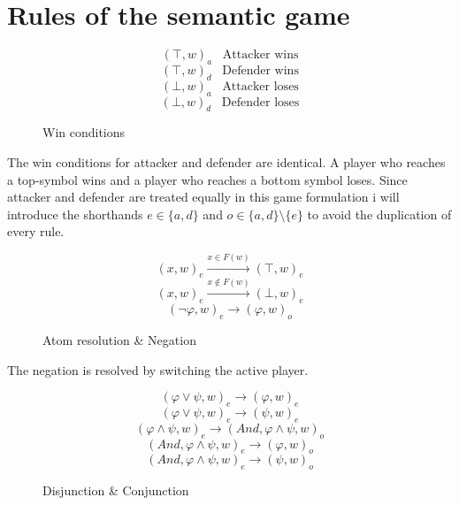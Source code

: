 \documentclass[a4paper,american]{paper}
\theoremstyle{definition}\newtheorem{definition}{Definition}
\begin{document}
\section*{Rules of the semantic game}
\begin{figure}[H]
	\centering
	\begin{equation}
		(\top ,w)_{a}\hspace{10pt}\text{Attacker wins}
	\end{equation}
	\begin{equation}
		(\top ,w)_{d}\hspace{10pt}\text{Defender wins}
	\end{equation}
	\begin{equation}
		(\bot ,w)_{a}\hspace{10pt}\text{Attacker loses}
	\end{equation}
	\begin{equation}
		(\bot ,w)_{d}\hspace{10pt}\text{Defender loses}
	\end{equation}
	\caption{Win conditions}
	\label{fig:win_rules}
\end{figure}
	The win conditions for attacker and defender are identical.
	A player who reaches a top-symbol wins and a player who reaches a bottom symbol loses.
	Since attacker and defender are treated equally in this game formulation i will introduce the shorthands $e\in\{ a, d\}$ and $o \in \{ a, d\}\setminus{}\{ e\}$ to avoid the duplication of every rule.
\begin{figure}[H]
	\centering
	\begin{equation}
		(x,w)_{e}\xrightarrow{x\in F(w)}(\top ,w)_{e}
	\end{equation}
	\begin{equation}
		(x,w)_{e}\xrightarrow{x\not\in F(w)}(\bot ,w)_{e}
	\end{equation}
	\begin{equation}
		(\neg\varphi ,w)_{e}\rightarrow (\varphi ,w)_{o}
	\end{equation}
	\caption{Atom resolution \& Negation}
	\label{fig:neg_rules}
\end{figure}
	The negation is resolved by switching the active player.
\begin{figure}[H]
	\centering
	\begin{equation}
		(\varphi\vee\psi ,w)_e\rightarrow (\varphi ,w)_{e}
	\end{equation}
	\begin{equation}
		(\varphi\vee\psi ,w)_e\rightarrow (\psi ,w)_{e}
	\end{equation}
	\begin{equation}
		(\varphi\wedge\psi ,w)_e\rightarrow (And, \varphi\wedge\psi ,w)_{o}
	\end{equation}
	\begin{equation}
		(And, \varphi\wedge\psi ,w)_e\rightarrow (\varphi ,w)_{o}
	\end{equation}
	\begin{equation}
		(And, \varphi\wedge\psi ,w)_e\rightarrow (\psi ,w)_{o}
	\end{equation}
	\caption{Disjunction \& Conjunction}
	\label{fig:neg_rules}
\end{figure}
\end{document}
